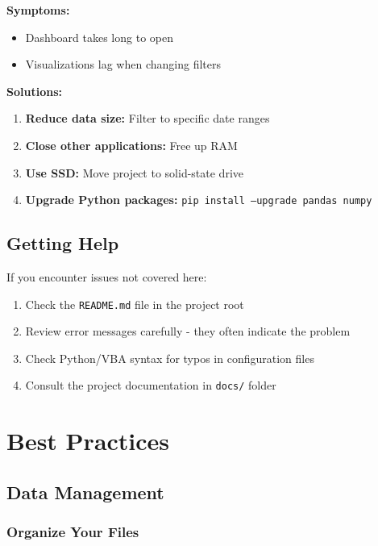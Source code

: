 \documentclass[11pt,a4paper]{article}
\begin{document}
\textbf{Symptoms:}
\begin{itemize}[leftmargin=*]
    \item Dashboard takes long to open
    \item Visualizations lag when changing filters
\end{itemize}

\textbf{Solutions:}
\begin{enumerate}[leftmargin=*]
    \item \textbf{Reduce data size:} Filter to specific date ranges
    \item \textbf{Close other applications:} Free up RAM
    \item \textbf{Use SSD:} Move project to solid-state drive
    \item \textbf{Upgrade Python packages:} \texttt{pip install --upgrade pandas numpy}
\end{enumerate}

\subsection{Getting Help}

If you encounter issues not covered here:

\begin{enumerate}[leftmargin=*]
    \item Check the \texttt{README.md} file in the project root
    \item Review error messages carefully - they often indicate the problem
    \item Check Python/VBA syntax for typos in configuration files
    \item Consult the project documentation in \texttt{docs/} folder
\end{enumerate}

\newpage

\section{Best Practices}

\subsection{Data Management}

\subsubsection{Organize Your Files}
\end{document}
